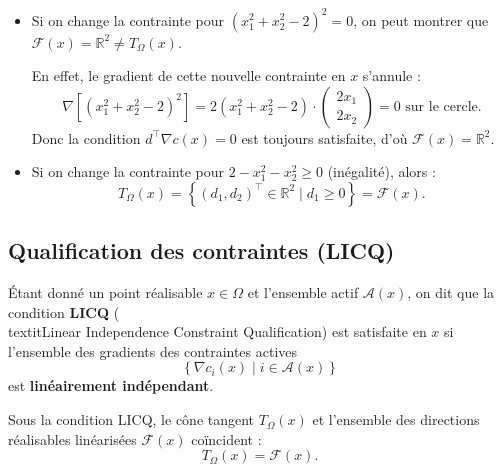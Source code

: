 \begin{remarque}
    \begin{itemize}
        \item Si on change la contrainte pour $(x_1^2 + x_2^2 - 2)^2 = 0$, on peut montrer que $\mathcal{F}(x) = \mathbb{R}^2 \neq T_\Omega(x)$.
        
        En effet, le gradient de cette nouvelle contrainte en $x$ s'annule :
        \[ \nabla \left[ (x_1^2 + x_2^2 - 2)^2 \right] = 2(x_1^2 + x_2^2 - 2) \cdot \begin{pmatrix} 2x_1 \\ 2x_2 \end{pmatrix} = 0 \text{ sur le cercle.} \]
        Donc la condition $d^\top \nabla c(x) = 0$ est toujours satisfaite, d'où $\mathcal{F}(x) = \mathbb{R}^2$.
        
        \item Si on change la contrainte pour $2 - x_1^2 - x_2^2 \geq 0$ (inégalité), alors :
        \begin{equation}
            T_\Omega(x) = \left\{ (d_1, d_2)^\top \in \mathbb{R}^2 \mid d_1 \geq 0 \right\} = \mathcal{F}(x).
        \end{equation}
    \end{itemize}
\end{remarque}

\subsection{Qualification des contraintes (LICQ)}

\begin{definition}
    Étant donné un point réalisable $x \in \Omega$ et l'ensemble actif $\mathcal{A}(x)$, on dit que la condition \textbf{LICQ} (\\textit{Linear Independence Constraint Qualification}) est satisfaite en $x$ si l'ensemble des gradients des contraintes actives
    \begin{equation}
        \left\{ \nabla c_i(x) \mid i \in \mathcal{A}(x) \right\}
    \end{equation}
    est \textbf{linéairement indépendant}.
\end{definition}

\begin{proposition}
    Sous la condition LICQ, le cône tangent $T_\Omega(x)$ et l'ensemble des directions réalisables linéarisées $\mathcal{F}(x)$ coïncident :
    \begin{equation}
        T_\Omega(x) = \mathcal{F}(x).
    \end{equation}
\end{proposition}

